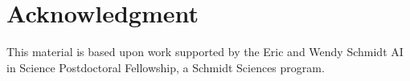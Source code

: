 \section*{Acknowledgment}

This material is based upon work supported by the Eric and Wendy Schmidt AI in Science Postdoctoral Fellowship, a Schmidt Sciences program.

